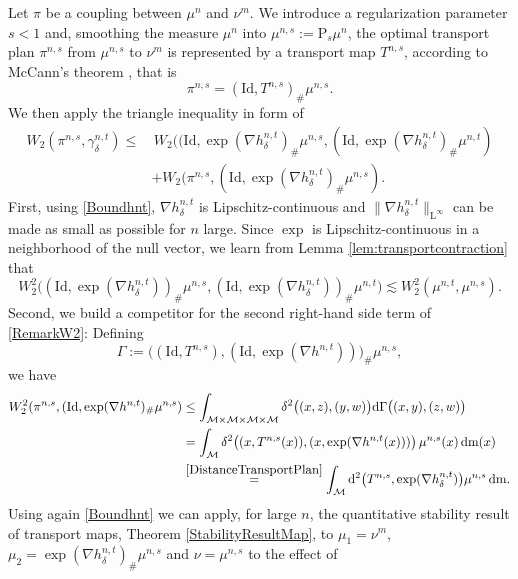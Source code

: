 \documentclass[11pt,a4paper,oneside]{amsart}
\numberwithin{equation}{section}
\newcommand{\dd}{\mathrm{d}}
\newcommand{\LL}{\mathrm{L}}
\newcommand{\m}{\mathrm{m}}
\begin{document}
Let $\pi$ be a coupling between $\mu^n$ and $\nu^m$. We introduce a regularization parameter $s<1$ and, smoothing the measure $\mu^n$ into $\mu^{n,s}:=\text{P}_s\mu^n$, the optimal transport plan $\pi^{n,s}$ from $\mu^{n,s}$ to $\nu^m$ is represented by a transport map $T^{n,s}$, according to McCann’s theorem \cite{McCann2001}, that is
%
$$\pi^{n,s}=(\text{Id},T^{n,s})_\#\mu^{n,s}.$$
%
We then apply the triangle inequality in form of
%
\begin{equation}\label{RemarkW2}
\begin{aligned}
W_2(\pi^{n,s},\gamma^{n,t}_\delta)\leq &\, W_2((\mathrm{Id},\exp(\nabla h^{n,t}_\delta)_\#\mu^{n,s},(\mathrm{Id},\exp(\nabla h^{n,t}_\delta)_\#\mu^{n,t})\\
&+W_2(\pi^{n,s},(\mathrm{Id},\exp(\nabla h^{n,t}_\delta)_\#\mu^{n,s}).
\end{aligned}
\end{equation}
%
First, using \eqref{Boundhnt}, $\nabla h^{n,t}_\delta$ is Lipschitz-continuous and $\|\nabla h^{n,t}_\delta\|_{\LL^{\infty}}$ can be made as small as possible for $n$ large. Since $\exp$ is Lipschitz-continuous in a neighborhood of the null vector, we learn from Lemma \ref{lem:transportcontraction} that
%
\begin{equation}\label{EstimateFirstTermRemark}
%
W^{2}_2\big((\mathrm{Id},\exp(\nabla h^{n,t}_\delta))_\#\mu^{n,s},(\mathrm{Id},\exp(\nabla h^{n,t}_\delta))_\#\mu^{n,t}\big)\lesssim W^{2}_2(\mu^{n,t},\mu^{n,s}).
%
\end{equation}
%
Second, we build a competitor for the second right-hand side term of \eqref{RemarkW2}: Defining
%
$$\Gamma:=\big((\text{Id},T^{n,s}),(\text{Id},\exp(\nabla h^{n,t}))\big)_\#\mu^{n,s},$$
%
we have
%
\begin{align*}
W^{2}_2(\pi^{n,s},(\mathrm{Id},\exp(\nabla h^{n,t})_\#\mu^{n,s})&\leq \int_{\mathcal{M}\times\mathcal{M}\times\mathcal{M}\times\mathcal{M}}\delta^2\big((x,z),(y,w)\big)\dd \Gamma\big((x,y),(z,w)\big)\\
&=\int_{\mathcal{M}}\delta^2\big((x,T^{n,s}(x)),(x,\exp(\nabla h^{n,t}(x)))\big)\,\mu^{n,s}(x)\,\dd\m(x)\\
&\stackrel{\eqref{DistanceTransportPlan}}{=}\int_{\mathcal{M}}\dd^2\big(T^{n,s},\exp(\nabla h^{n,t}_{\delta})\big)\mu^{n,s}\,\dd\m.
\end{align*}
%
Using again \eqref{Boundhnt} we can apply, for large $n$, the quantitative stability result of transport maps, Theorem \ref{StabilityResultMap}, to $\mu_1=\nu^m$, $\mu_2=\exp(\nabla h^{n,t}_\delta)_\#\mu^{n,s}$ and $\nu=\mu^{n,s}$ to the effect of 
\end{document}
